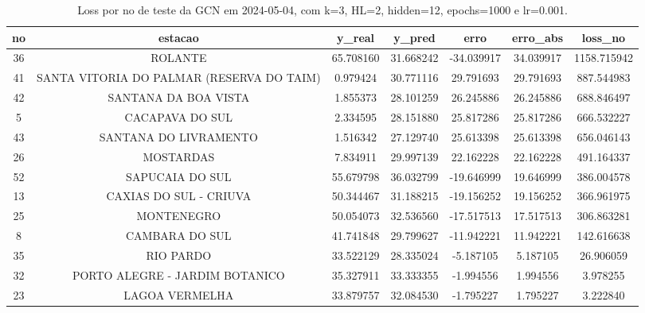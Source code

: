 \begin{table}[h]
\centering
\caption{Loss por no de teste da GCN em 2024-05-04, com k=3, HL=2, hidden=12, epochs=1000 e lr=0.001.}
\label{tab:gcn_loss_k3_hl2_h12_e1000_d20240504}
\begin{tabular}{ccccccc}
\toprule
no & estacao & y\_real & y\_pred & erro & erro\_abs & loss\_no \\
\midrule
36 & ROLANTE & 65.708160 & 31.668242 & -34.039917 & 34.039917 & 1158.715942 \\
41 & SANTA VITORIA DO PALMAR (RESERVA DO TAIM) & 0.979424 & 30.771116 & 29.791693 & 29.791693 & 887.544983 \\
42 & SANTANA DA BOA VISTA & 1.855373 & 28.101259 & 26.245886 & 26.245886 & 688.846497 \\
5 & CACAPAVA DO SUL & 2.334595 & 28.151880 & 25.817286 & 25.817286 & 666.532227 \\
43 & SANTANA DO LIVRAMENTO & 1.516342 & 27.129740 & 25.613398 & 25.613398 & 656.046143 \\
26 & MOSTARDAS & 7.834911 & 29.997139 & 22.162228 & 22.162228 & 491.164337 \\
52 & SAPUCAIA DO SUL & 55.679798 & 36.032799 & -19.646999 & 19.646999 & 386.004578 \\
13 & CAXIAS DO SUL - CRIUVA & 50.344467 & 31.188215 & -19.156252 & 19.156252 & 366.961975 \\
25 & MONTENEGRO & 50.054073 & 32.536560 & -17.517513 & 17.517513 & 306.863281 \\
8 & CAMBARA DO SUL & 41.741848 & 29.799627 & -11.942221 & 11.942221 & 142.616638 \\
35 & RIO PARDO & 33.522129 & 28.335024 & -5.187105 & 5.187105 & 26.906059 \\
32 & PORTO ALEGRE - JARDIM BOTANICO & 35.327911 & 33.333355 & -1.994556 & 1.994556 & 3.978255 \\
23 & LAGOA VERMELHA & 33.879757 & 32.084530 & -1.795227 & 1.795227 & 3.222840 \\
\bottomrule
\end{tabular}
\end{table}
